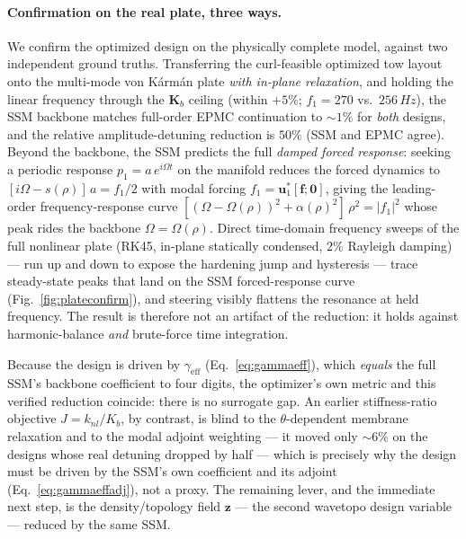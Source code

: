 \documentclass[11pt]{article}
\newcommand{\Om}{\Omega}
\begin{document}
\paragraph{Confirmation on the real plate, three ways.} We confirm the optimized
design on the physically complete model, against two independent ground truths.
Transferring the curl-feasible optimized tow layout onto the multi-mode von
K\'arm\'an plate \emph{with in-plane relaxation}, and holding the linear frequency
through the $\bm K_b$ ceiling (within $+5\%$; $f_1=270$ vs.\ $256\,\si{Hz}$), the
SSM backbone matches full-order EPMC continuation to $\sim\!1\%$ for \emph{both}
designs, and the relative amplitude-detuning reduction is $50\%$ (SSM and EPMC
agree). Beyond the
backbone, the SSM predicts the full \emph{damped forced response}: seeking a
periodic response $p_1=a\,e^{i\Om t}$ on the manifold reduces the forced dynamics
to $[i\Om-s(\rho)]\,a=f_1/2$ with modal forcing $f_1=\bm u_1^{*}[\bm f;\bm 0]$,
giving the leading-order frequency-response curve
$[(\Om-\Om(\rho))^2+\alpha(\rho)^2]\,\rho^2=|f_1|^2$ whose peak rides the backbone
$\Om=\Om(\rho)$. Direct time-domain frequency sweeps of the full nonlinear plate
(RK45, in-plane statically condensed, $2\%$ Rayleigh damping) --- run up and down
to expose the hardening jump and hysteresis --- trace steady-state peaks that land
on the SSM forced-response curve (Fig.~\ref{fig:plateconfirm}), and steering
visibly flattens the resonance at held frequency. The result is therefore not an
artifact of the reduction: it holds against harmonic-balance \emph{and}
brute-force time integration.

Because the design is driven by $\gamma_{\mathrm{eff}}$
(Eq.~\eqref{eq:gammaeff}), which \emph{equals} the full SSM's backbone coefficient
to four digits, the optimizer's own metric and this verified reduction coincide:
there is no surrogate gap. An earlier stiffness-ratio objective
$J=k_{nl}/K_b$, by contrast, is blind to the $\theta$-dependent membrane
relaxation and to the modal adjoint weighting --- it moved only $\sim\!6\%$ on the
designs whose real detuning dropped by half --- which is precisely why the design
must be driven by the SSM's own coefficient and its adjoint
(Eq.~\eqref{eq:gammaeffadj}), not a proxy. The remaining lever, and the immediate
next step, is the density/topology field $\bm z$ --- the second wavetopo design
variable --- reduced by the same SSM.
\end{document}
